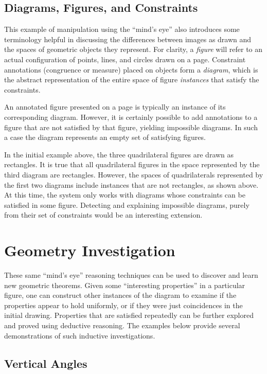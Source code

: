 \subsection{Diagrams, Figures, and Constraints}

This example of manipulation using the ``mind's eye'' also introduces
some terminology helpful in discussing the differences between images
as drawn and the spaces of geometric objects they represent.  For
clarity, a \emph{figure} will refer to an actual configuration of
points, lines, and circles drawn on a page.  Constraint annotations
(congruence or measure) placed on objects form a \emph{diagram},
which is the abstract representation of the entire space of figure
\emph{instances} that satisfy the constraints.

An annotated figure presented on a page is typically an instance of
its corresponding diagram.  However, it is certainly possible to add
annotations to a figure that are not satisfied by that figure,
yielding impossible diagrams.  In such a case the diagram represents
an empty set of satisfying figures.

In the initial example above, the three quadrilateral figures are
drawn as rectangles.  It is true that all quadrilateral figures in the
space represented by the third diagram are rectangles.  However, the
spaces of quadrilaterals represented by the first two diagrams
include instances that are not rectangles, as shown above.  At this
time, the system only works with diagrams whose constraints can be
satisfied in some figure.  Detecting and explaining impossible
diagrams, purely from their set of constraints would be an interesting
extension.

\newpage
\section{Geometry Investigation}

These same ``mind's eye'' reasoning techniques can be used to discover
and learn new geometric theorems.  Given some ``interesting
properties'' in a particular figure, one can construct other instances
of the diagram to examine if the properties appear to hold uniformly,
or if they were just coincidences in the initial drawing.  Properties
that are satisfied repeatedly can be further explored and proved using
deductive reasoning.  The examples below provide several
demonstrations of such inductive investigations.

\subsection{Vertical Angles}

